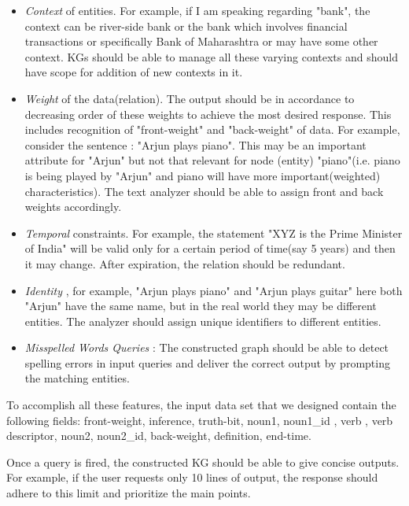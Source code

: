 \documentclass[conference]{IEEEtran}
\begin{document}
\begin{itemize}
    \item\textit{Context} \cite{b8} of entities. For example, if I am speaking regarding "bank", the context can be river-side bank or the bank which involves financial transactions or specifically Bank of Maharashtra or may have some other context. KGs should be able to manage all these varying contexts and should have scope for addition of new contexts in it. 

    
	\item\textit{Weight} \cite{b8} of the data(relation). The output should be in accordance to decreasing order of these weights to achieve the most desired response. This includes recognition of "front-weight" and "back-weight" of data. For example, consider the sentence : "Arjun plays piano". This may be an important attribute for "Arjun" but not that relevant for node (entity) "piano"(i.e. piano is being played by "Arjun" and piano will have more important(weighted) characteristics). The text analyzer should be able to assign front and back weights accordingly.

 
	\item\textit{Temporal} \cite{b8} constraints. For example, the statement "XYZ is the Prime Minister of India" will be valid only for a certain period of time(say 5 years) and then it may change. After expiration, the relation should be redundant.

 
	\item\textit{Identity} \cite{b8}, for example, "Arjun plays piano" and "Arjun plays guitar" here both "Arjun" have the same name, but in the real world they may be different entities. 
 The analyzer should assign unique identifiers to different entities.
	
 \item\textit{Misspelled Words Queries} : The constructed graph should be able to detect spelling errors in input queries and deliver the correct output by prompting the matching entities.
 
\end{itemize}


To accomplish all these features, the input data set that we designed contain the following fields: front-weight, inference, truth-bit, noun1, noun1\_id , verb , verb descriptor, noun2, noun2\_id, back-weight, definition, end-time.

Once a query is fired, the constructed KG should be able to give concise outputs. For example, if the user requests only 10 lines of output, the response should adhere to this limit and prioritize the main points.
\end{document}
